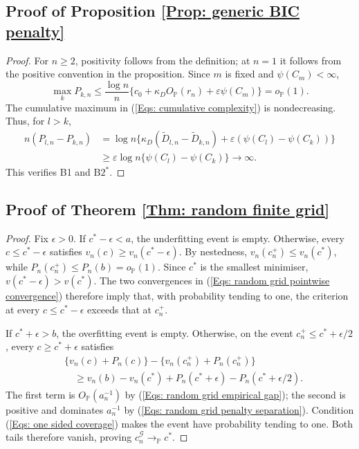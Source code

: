 \documentclass[12pt]{article}
\newenvironment{bluechange}{\begingroup\color[rgb]{0.00,0.00,1.00}}{\endgroup}
\theoremstyle{remark}
\theoremstyle{plain}
\begin{document}
\begin{bluechange}
\subsection{Proof of Proposition \ref{Prop: generic BIC penalty}}
\begin{proof}
For $n\ge2$, positivity follows from the definition; at $n=1$ it follows from the positive convention in the proposition. Since $m$ is fixed and $\psi(C_m)<\infty$,
\[
\max_kP_{k,n}\le\frac{\log n}{n}
\{c_0+\kappa_DO_{\mathbb P}(r_n)+\varepsilon\psi(C_m)\}
=o_{\mathbb P}(1).
\]
The cumulative maximum in (\ref{Eqs: cumulative complexity}) is nondecreasing. Thus, for $l>k$,
\begin{align*}
n(P_{l,n}-P_{k,n})
&=\log n\{\kappa_D(\widetilde D_{l,n}-\widetilde D_{k,n})
+\varepsilon(\psi(C_l)-\psi(C_k))\}\\
&\ge\varepsilon\log n\{\psi(C_l)-\psi(C_k)\}\longrightarrow\infty.
\end{align*}
This verifies B1 and $\mathrm{B2}^*$.
\end{proof}

\subsection{Proof of Theorem \ref{Thm: random finite grid}}
\begin{proof}
Fix $\epsilon>0$. If $c^*-\epsilon<a$, the underfitting event is empty. Otherwise, every $c\le c^*-\epsilon$ satisfies $v_n(c)\ge v_n(c^*-\epsilon)$. By nestedness, $v_n(c_n^+)\le v_n(c^*)$, while $P_n(c_n^+)\le P_n(b)=o_{\mathbb P}(1)$. Since $c^*$ is the smallest minimiser, $v(c^*-\epsilon)>v(c^*)$. The two convergences in (\ref{Eqs: random grid pointwise convergence}) therefore imply that, with probability tending to one, the criterion at every $c\le c^*-\epsilon$ exceeds that at $c_n^+$.

If $c^*+\epsilon>b$, the overfitting event is empty. Otherwise, on the event $c_n^+\le c^*+\epsilon/2$, every $c\ge c^*+\epsilon$ satisfies
\begin{align*}
&\{v_n(c)+P_n(c)\}-\{v_n(c_n^+)+P_n(c_n^+)\}\\
&\quad\ge v_n(b)-v_n(c^*)
+P_n(c^*+\epsilon)-P_n(c^*+\epsilon/2).
\end{align*}
The first term is $O_{\mathbb P}(a_n^{-1})$ by (\ref{Eqs: random grid empirical gap}); the second is positive and dominates $a_n^{-1}$ by (\ref{Eqs: random grid penalty separation}). Condition (\ref{Eqs: one sided coverage}) makes the event have probability tending to one. Both tails therefore vanish, proving $\widehat c_n^{\mathcal G}\to_{\mathbb P}c^*$.
\end{proof}


\end{bluechange}
\end{document}
